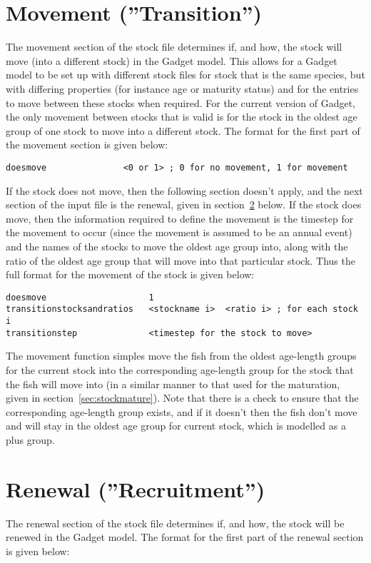 \documentclass[10pt,twoside]{book}
\begin{document}
\section{Movement (''Transition'')}\label{sec:stockmove}
The movement section of the stock file determines if, and how, the stock will move (into a different stock) in the Gadget model.  This allows for a Gadget model to be set up with different stock files for stock that is the same species, but with differing properties (for instance age or maturity status) and for the entries to move between these stocks when required.  For the current version of Gadget, the only movement between stocks that is valid is for the stock in the oldest age group of one stock to move into a different stock.  The format for the first part of the movement section is given below:

{\small\begin{verbatim}
doesmove               <0 or 1> ; 0 for no movement, 1 for movement
\end{verbatim}}

If the stock does not move, then the following section doesn't apply, and the next section of the input file is the renewal, given in section~\ref{sec:stockrenew} below.  If the stock does move, then the information required to define the movement is the timestep for the movement to occur (since the movement is assumed to be an annual event) and the names of the stocks to move the oldest age group into, along with the ratio of the oldest age group that will move into that particular stock.  Thus the full format for the movement of the stock is given below:

{\small\begin{verbatim}
doesmove                    1
transitionstocksandratios   <stockname i>  <ratio i> ; for each stock i
transitionstep              <timestep for the stock to move>
\end{verbatim}}

The movement function simples move the fish from the oldest age-length groups for the current stock into the corresponding age-length group for the stock that the fish will move into (in a similar manner to that used for the maturation, given in section~\ref{sec:stockmature}).  Note that there is a check to ensure that the corresponding age-length group exists, and if it doesn't then the fish don't move and will stay in the oldest age group for current stock, which is modelled as a plus group.

\section{Renewal (''Recruitment'')}\label{sec:stockrenew}
The renewal section of the stock file determines if, and how, the stock will be renewed in the Gadget model. The format for the first part of the renewal section is given below:
\end{document}
